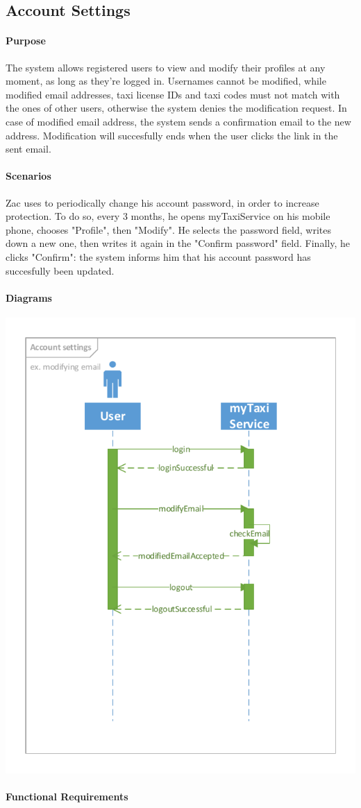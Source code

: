 \subsection{Account Settings}

\paragraph{Purpose}
The system allows registered users to view and modify their profiles at any moment, as long as they're logged in. Usernames cannot be modified, while modified email addresses, taxi license IDs and taxi codes must not match with the ones of other users, otherwise the system denies the modification request. In case of modified email address, the system sends a confirmation email to the new address. Modification will succesfully ends when the user clicks the link in the sent email. 

\paragraph{Scenarios}
Zac uses to periodically change his account password, in order to increase protection. To do so, every 3 months, he opens myTaxiService on his mobile phone, chooses "Profile", then "Modify". He selects the password field, writes down a new one, then writes it again in the "Confirm password" field. Finally, he clicks "Confirm": the system informs him that his account password has succesfully been updated.

\paragraph{Diagrams}
\begin{center}
	\includegraphics[width=\textwidth]{diagrams/account_settings}
\end{center}
\paragraph{Functional Requirements}
